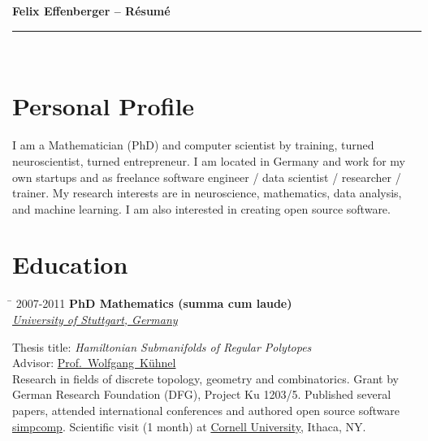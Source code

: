 \documentclass[10pt]{article} %
\newlength{\marginwidth}
\newlength{\smallertextwidth}
\renewcommand{\title}[1]{
{\huge{\color{headercolor}\textbf{#1}}}\\
\rule{\textwidth}{0.5mm}\\
}
\newcommand{\education}[4]{
\begin{tabbing}%
\hspace{\marginwidth}\=\kill%
{#1} \> \textbf{#2}\\
\>\+ \textit{#3}\\[5pt]
\begin{minipage}{\smallertextwidth}
\vspace{5pt}
#4
\end{minipage}
\end{tabbing}
}
\begin{document}

\title{Felix Effenberger -- Résumé}




\section{Personal Profile}
%
I am a Mathematician (PhD) and computer scientist by training, turned neuroscientist, turned entrepreneur. 
I am located in Germany and work for my own startups and as freelance software engineer / data scientist / researcher / trainer.
My research interests are in neuroscience, mathematics, data analysis, and machine learning.
I am also interested in creating open source software.


\section{Education}
%
\education
{2007-2011}
{PhD Mathematics \textmd{(summa cum laude)}}
{\href{https://uni-stuttgart.de}{University of Stuttgart, Germany}}
{
Thesis title: \textit{Hamiltonian Submanifolds of Regular Polytopes}\\
Advisor: \href{http://www.igt.uni-stuttgart.de/LstDiffgeo/Kuehnel/}{Prof.~Wolfgang~Kühnel}\\[5pt]
%
Research in fields of discrete topology, geometry and combinatorics.
Grant by German Research Foundation (DFG), Project Ku 1203/5.
Published several papers, attended international conferences and authored open source software \href{https://github.com/simpcomp-team/simpcomp}{simpcomp}.
Scientific visit (1 month) at \href{https://www.cornell.edu}{Cornell University}, Ithaca, NY. 
}

\vspace{2mm}
\end{document}
